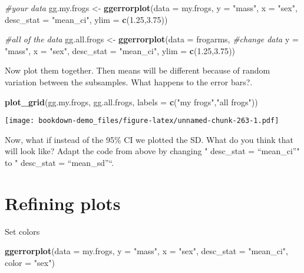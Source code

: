 \documentclass[]{book}
\newenvironment{Shaded}{\begin{snugshade}}{\end{snugshade}}
\newcommand{\KeywordTok}[1]{\textcolor[rgb]{0.13,0.29,0.53}{\textbf{#1}}}
\newcommand{\DataTypeTok}[1]{\textcolor[rgb]{0.13,0.29,0.53}{#1}}
\newcommand{\FloatTok}[1]{\textcolor[rgb]{0.00,0.00,0.81}{#1}}
\newcommand{\StringTok}[1]{\textcolor[rgb]{0.31,0.60,0.02}{#1}}
\newcommand{\CommentTok}[1]{\textcolor[rgb]{0.56,0.35,0.01}{\textit{#1}}}
\newcommand{\NormalTok}[1]{#1}
\theoremstyle{definition}
\theoremstyle{definition}
\theoremstyle{definition}
\theoremstyle{remark}
\begin{document}
\begin{Shaded}
\begin{Highlighting}[]
\CommentTok{#your data}
\NormalTok{gg.my.frogs <-}\StringTok{ }\KeywordTok{ggerrorplot}\NormalTok{(}\DataTypeTok{data =}\NormalTok{ my.frogs,}
          \DataTypeTok{y =} \StringTok{"mass"}\NormalTok{,}
          \DataTypeTok{x =} \StringTok{"sex"}\NormalTok{,}
          \DataTypeTok{desc_stat =} \StringTok{"mean_ci"}\NormalTok{,}
          \DataTypeTok{ylim =} \KeywordTok{c}\NormalTok{(}\FloatTok{1.25}\NormalTok{,}\FloatTok{3.75}\NormalTok{))}

\CommentTok{#all of the data}
\NormalTok{gg.all.frogs <-}\StringTok{ }\KeywordTok{ggerrorplot}\NormalTok{(}\DataTypeTok{data =}\NormalTok{ frogarms, }\CommentTok{#change data}
          \DataTypeTok{y =} \StringTok{"mass"}\NormalTok{,}
          \DataTypeTok{x =} \StringTok{"sex"}\NormalTok{,}
          \DataTypeTok{desc_stat =} \StringTok{"mean_ci"}\NormalTok{,}
          \DataTypeTok{ylim =} \KeywordTok{c}\NormalTok{(}\FloatTok{1.25}\NormalTok{,}\FloatTok{3.75}\NormalTok{))}
\end{Highlighting}
\end{Shaded}

Now plot them together. Then means will be different because of random
variation between the subsamples. What happens to the error bars?.

\begin{Shaded}
\begin{Highlighting}[]
\KeywordTok{plot_grid}\NormalTok{(gg.my.frogs, }
\NormalTok{          gg.all.frogs,}
          \DataTypeTok{labels =} \KeywordTok{c}\NormalTok{(}\StringTok{"my frogs"}\NormalTok{,}\StringTok{"all frogs"}\NormalTok{))}
\end{Highlighting}
\end{Shaded}

\texttt{[image: bookdown-demo\_files/figure-latex/unnamed-chunk-263-1.pdf]}

Now, what if instead of the 95\% CI we plotted the SD. What do you think
that will look like? Adapt the code from above by changing " desc\_stat
= ``mean\_ci''" to " desc\_stat = ``mean\_sd''``.

\section{Refining plots}\label{refining-plots}

Set colors

\begin{Shaded}
\begin{Highlighting}[]
\KeywordTok{ggerrorplot}\NormalTok{(}\DataTypeTok{data =}\NormalTok{ my.frogs,}
          \DataTypeTok{y =} \StringTok{"mass"}\NormalTok{,}
          \DataTypeTok{x =} \StringTok{"sex"}\NormalTok{,}
          \DataTypeTok{desc_stat =} \StringTok{"mean_ci"}\NormalTok{,}
          \DataTypeTok{color =} \StringTok{"sex"}\NormalTok{)}
\end{Highlighting}
\end{Shaded}
\end{document}
